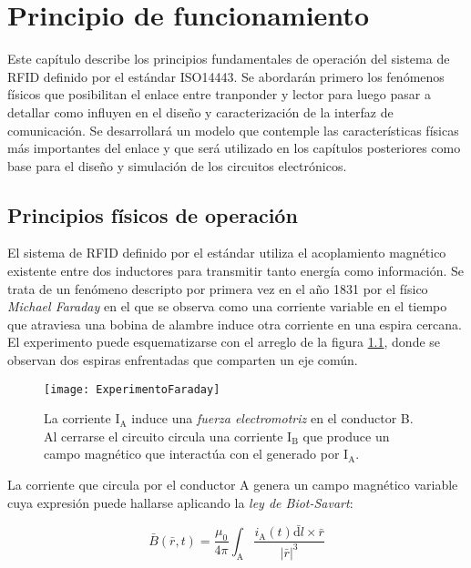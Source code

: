 \chapter{Principio de funcionamiento}

Este capítulo describe los principios fundamentales de operación del sistema de RFID definido por el estándar ISO14443. Se abordarán primero los fenómenos físicos que posibilitan el enlace entre tranponder y lector para luego pasar a detallar como influyen en el diseño y caracterización de la interfaz de comunicación. Se desarrollará un modelo que contemple las características físicas más importantes del enlace y que será utilizado en los capítulos posteriores como base para el diseño y simulación de los circuitos electrónicos.

\section{Principios físicos de operación}

El sistema de RFID definido por el estándar utiliza el acoplamiento magnético existente entre dos inductores para transmitir tanto energía como información. Se trata de un fenómeno descripto por primera vez en el año 1831 por el físico \emph{Michael Faraday} en el que se observa como una corriente variable en el tiempo que atraviesa una bobina de alambre induce otra corriente en una espira cercana. El experimento puede esquematizarse con el arreglo de la figura \ref{fig:ExperimentoFaraday}, donde se observan dos espiras enfrentadas que comparten un eje común.

\begin{figure}
	\centering
	\texttt{[image: ExperimentoFaraday]}
	\caption{La corriente \(\mathrm{I}_\mathrm{A}\) induce una \emph{fuerza electromotriz} en el conductor B. Al cerrarse el circuito circula una corriente \(\mathrm{I}_\mathrm{B}\) que produce un campo magnético que interactúa con el generado por \(\mathrm{I}_\mathrm{A}\).}
	\label{fig:ExperimentoFaraday}
\end{figure}

La corriente que circula por el conductor A genera un campo magnético variable cuya expresión puede hallarse aplicando la \emph{ley de Biot-Savart}:

\begin{equation}
	\label{eq:EcBiot-Savart}
	\bar{B}(\bar{r}, t)=\frac{\mu_0}{4 \pi} \int_\mathrm{A} \frac{i_\mathrm{A}(t) \bar{\mathrm{d}l} \times \bar{r}}{|\bar{r}|^3}
\end{equation}


